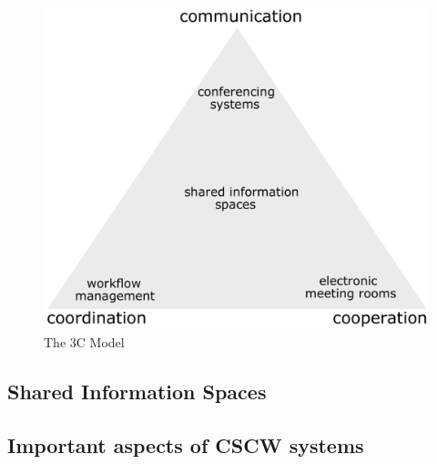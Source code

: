 \begin{figure}[H]
 \centering
 \includegraphics[width=0.8\columnwidth]{images/3C-model.pdf}
 \caption{The 3C Model \citep{Koch2008}}
\label{fig:images_cscw_3C_model}
\end{figure}


\subsection{Shared Information Spaces}
\label{sec:cscw_shared_spaces}


\subsection{Important aspects of CSCW systems}
\label{sec:cscw_req_aspects}


